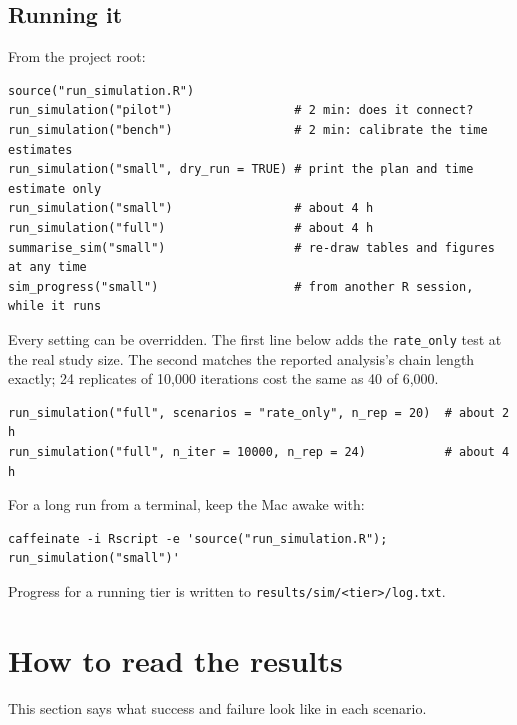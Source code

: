 \documentclass[11pt]{article}
\newcommand{\code}[1]{\texttt{\small #1}}
\begin{document}
\subsection{Running it}

From the project root:

\begin{verbatim}
source("run_simulation.R")
run_simulation("pilot")                 # 2 min: does it connect?
run_simulation("bench")                 # 2 min: calibrate the time estimates
run_simulation("small", dry_run = TRUE) # print the plan and time estimate only
run_simulation("small")                 # about 4 h
run_simulation("full")                  # about 4 h
summarise_sim("small")                  # re-draw tables and figures at any time
sim_progress("small")                   # from another R session, while it runs
\end{verbatim}

Every setting can be overridden. The first line below adds the \code{rate\_only} test at the real study size. The second matches the reported analysis's chain length exactly; 24 replicates of 10,000 iterations cost the same as 40 of 6,000.

\begin{verbatim}
run_simulation("full", scenarios = "rate_only", n_rep = 20)  # about 2 h
run_simulation("full", n_iter = 10000, n_rep = 24)           # about 4 h
\end{verbatim}

For a long run from a terminal, keep the Mac awake with:

\begin{verbatim}
caffeinate -i Rscript -e 'source("run_simulation.R"); run_simulation("small")'
\end{verbatim}

Progress for a running tier is written to \code{results/sim/<tier>/log.txt}.

\section{How to read the results}

This section says what success and failure look like in each scenario.
\end{document}
